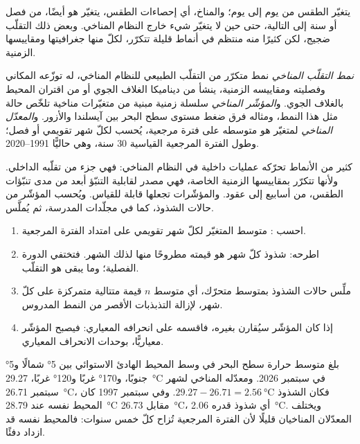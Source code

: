 يتغيّر الطقس من يوم إلى يوم؛ والمناخ، أي إحصاءات الطقس، يتغيّر هو أيضًا، من فصل
أو سنة إلى التالية، حتى حين لا يتغيّر شيء خارج النظام المناخي. وبعض ذلك
التقلّب ضجيج، لكن كثيرًا منه منتظم في أنماط قليلة تتكرّر، لكلّ منها
جغرافيتها ومقاييسها الزمنية.

\begin{definition}\label{def:b2:climate-variability:modes}
\emph{نمط التقلّب المناخي} نمط متكرّر من
التقلّب الطبيعي للنظام المناخي، له توزّعه المكاني وفصليته ومقاييسه
الزمنية، ينشأ من ديناميكا الغلاف الجوي أو من اقتران المحيط
بالغلاف الجوي. و\emph{المؤشّر المناخي} سلسلة زمنية مبنية من متغيّرات
مناخية تلخّص حالة مثل هذا النمط، ومثاله فرق ضغط مستوى
سطح البحر بين آيسلندا والأزور. و\emph{المعدّل المناخي} لمتغيّر
هو متوسطه على فترة مرجعية، يُحسب لكلّ شهر تقويمي أو فصل؛ وطول الفترة
المرجعية القياسية 30 سنة، وهي حاليًّا 1991--2020.
\end{definition}

كثير من الأنماط تحرّكه عمليات داخلية في النظام المناخي: فهي جزء من
تقلّبه الداخلي. ولأنها تتكرّر بمقاييسها الزمنية الخاصة، فهي مصدر
لقابلية التنبّؤ أبعد من مدى تنبّؤات الطقس، من أسابيع إلى عقود. والمؤشّرات تجعلها
قابلة للقياس. ويُحسب المؤشّر من حالات الشذوذ، كما في مجلّدات المدرسة، ثم
يُملَّس.

\begin{method}\label{met:b2:climate-variability:index}
\begin{enumerate}
  \item احسب : متوسط المتغيّر لكلّ شهر تقويمي على امتداد
        الفترة المرجعية.
  \item اطرحه: شذوذ كلّ شهر هو قيمته مطروحًا منها  لذلك الشهر.
        فتختفي الدورة الفصلية؛ وما يبقى هو التقلّب.
  \item ملِّس حالات الشذوذ بمتوسط متحرّك، أي متوسط $n$ قيمة متتالية متمركزة على
        كلّ شهر، لإزالة التذبذبات الأقصر من النمط المدروس.
  \item إذا كان المؤشّر سيُقارن بغيره، فاقسمه على انحرافه المعياري: فيصبح المؤشّر
        معياريًّا، بوحدات الانحراف المعياري.
\end{enumerate}
\end{method}

\begin{example}[شذوذ]\label{ex:b2:climate-variability:anomaly}
بلغ متوسط حرارة سطح البحر في وسط المحيط الهادئ الاستوائي بين \ang{5} شمالًا
و\ang{5} جنوبًا، و\ang{170} غربًا و\ang{120} غربًا، \qty{29.27}{\celsius} في سبتمبر 2026. ومعدّله المناخي
لشهر سبتمبر \qty{26.71}{\celsius}، فكان الشذوذ $29.27 - 26.71 = \qty{2.56}{\celsius}$.
وفي سبتمبر 1997 كان المحيط نفسه عند \qty{28.79}{\celsius} مقابل \qty{26.73}{\celsius}، أي
شذوذ قدره \qty{2.06}{\celsius}. ويختلف المعدّلان المناخيان قليلًا لأن الفترة المرجعية
تُزاح كلّ خمس سنوات: فالمحيط نفسه قد ازداد دفئًا.
\end{example}

